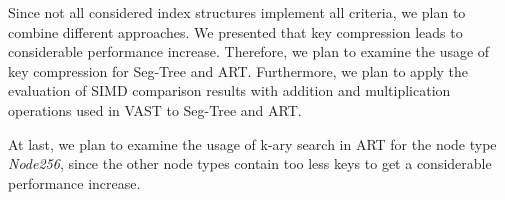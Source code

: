 \documentclass[conference]{IEEEtran}
\begin{document}
Since not all considered index structures implement all criteria, we plan to combine different approaches. We presented that key compression leads to considerable performance increase. Therefore, we plan to examine the usage of key compression for Seg-Tree and ART. Furthermore, we plan to apply the evaluation of SIMD comparison results with addition and multiplication operations used in VAST to Seg-Tree and ART. 

At last, we plan to examine the usage of k-ary search in ART for the node type \emph{Node256}, since the other node types contain too less keys to get a considerable performance increase. 


\end{document}
